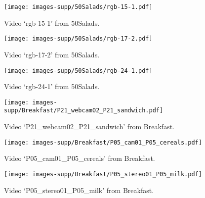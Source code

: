\documentclass[10pt,twocolumn,letterpaper]{article}
\begin{document}
\begin{figure}[h]
\vspace{-0.3cm}
\begin{center}
   \texttt{[image: images-supp/50Salads/rgb-15-1.pdf]}
\end{center}
   \caption{Video `rgb-15-1' from 50Salads.}
\label{fig:50Salads-4}
\end{figure}

\begin{figure}[h]
\vspace{-0.3cm}
\begin{center}
   \texttt{[image: images-supp/50Salads/rgb-17-2.pdf]}
\end{center}
   \caption{Video `rgb-17-2' from 50Salads.}
\label{fig:50Salads-5}
\end{figure}

\begin{figure}[h]
\vspace{-0.3cm}
\begin{center}
   \texttt{[image: images-supp/50Salads/rgb-24-1.pdf]}
\end{center}
   \caption{Video `rgb-24-1' from 50Salads.}
\label{fig:50Salads-6}
\end{figure}



\begin{figure}[h]
\vspace{-0.3cm}
\begin{center}
   \texttt{[image: images-supp/Breakfast/P21\_webcam02\_P21\_sandwich.pdf]}
\end{center}
   \caption{Video `P21\_webcam02\_P21\_sandwich' from Breakfast.}
\label{fig:Breakfast-1}
\end{figure}

\begin{figure}[h]
\vspace{-0.3cm}
\begin{center}
   \texttt{[image: images-supp/Breakfast/P05\_cam01\_P05\_cereals.pdf]}
\end{center}
   \caption{Video `P05\_cam01\_P05\_cereals' from Breakfast.}
\label{fig:Breakfast-2}
\end{figure}

\begin{figure}[h]
\vspace{-0.3cm}
\begin{center}
   \texttt{[image: images-supp/Breakfast/P05\_stereo01\_P05\_milk.pdf]}
\end{center}
   \caption{Video `P05\_stereo01\_P05\_milk' from Breakfast.}
\label{fig:Breakfast-3}
\end{figure}
\end{document}
